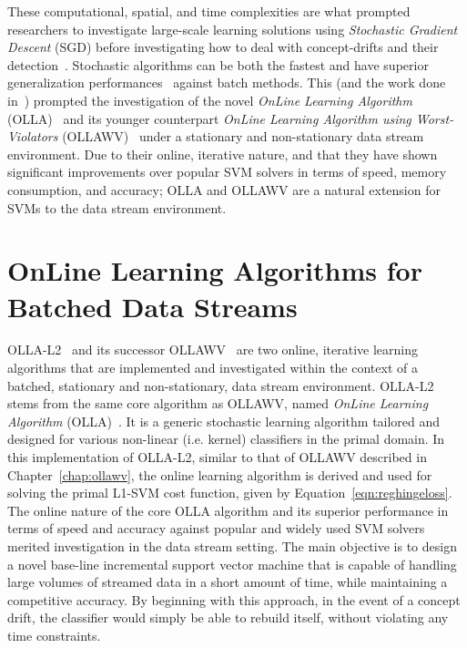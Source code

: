 \documentclass[reqno]{vcuthesis}
\numberwithin{equation}{chapter}
\begin{document}
These computational, spatial, and time complexities are what prompted researchers to investigate large-scale learning solutions using \textit{Stochastic Gradient Descent} (SGD) before investigating how to deal with concept-drifts and their detection~\cite{herbrich2016learning,kivinen2002large,rosenblatt1958perceptron,Schoelkopf2002,Shalev2014,shalev2011pegasos}. Stochastic algorithms can be both the fastest and have superior generalization performances~\cite{bousquet2008tradeoffs,kivinen2004online} against batch methods. This (and the work done in~\cite{Melki2016,kecman2016ieee}) prompted the investigation of the novel \textit{OnLine Learning Algorithm} (OLLA)~\cite{kecman2016fast} and its younger counterpart \textit{OnLine Learning Algorithm using Worst-Violators} (OLLAWV)~\cite{melki2018ollawv} under a stationary and non-stationary data stream environment. Due to their online, iterative nature, and that they have shown significant improvements over popular SVM solvers in terms of speed, memory consumption, and accuracy; OLLA and OLLAWV are a natural extension for SVMs to the data stream environment.

\section{OnLine Learning Algorithms for Batched Data Streams}
OLLA-L2~\cite{kecman2016fast} and its successor OLLAWV~\cite{melki2018ollawv} are two online, iterative learning algorithms that are implemented and investigated within the context of a batched, stationary and non-stationary, data stream environment. OLLA-L2 stems from the same core algorithm as OLLAWV, named \textit{OnLine Learning Algorithm} (OLLA)~\cite{kecman2016fast}. It is a generic stochastic learning algorithm tailored and designed for various non-linear (i.e. kernel) classifiers in the primal domain. In this implementation of OLLA-L2, similar to that of OLLAWV described in Chapter~\ref{chap:ollawv}, the online learning algorithm is derived and used for solving the primal L1-SVM cost function, given by Equation~\ref{eqn:reghingeloss}. The online nature of the core OLLA algorithm and its superior performance in terms of speed and accuracy against popular and widely used SVM solvers merited investigation in the data stream setting. The main objective is to design a novel base-line incremental support vector machine that is capable of handling large volumes of streamed data in a short amount of time, while maintaining a competitive accuracy. By beginning with this approach, in the event of a concept drift, the classifier would simply be able to rebuild itself, without violating any time constraints. 
\end{document}
